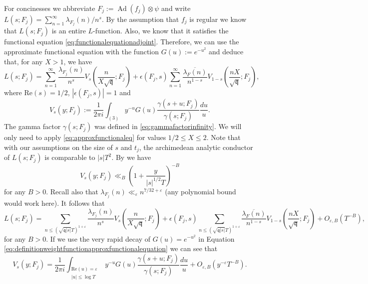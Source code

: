 \documentclass{article}
\theoremstyle{named}
\newcommand{\q}{\mathfrak{q}}
\DeclareMathOperator{\Ad}{Ad}
\begin{document}
For concinesses we abbreviate $F_j := \Ad(f_j)\otimes \psi$ and write $L(s; F_j) = \sum_{n = 1}^\infty \lambda_{F_j}(n)/n^s$.  By the assumption that $f_j$ is regular we know that $L(s; F_j)$ is an entire $L$-function. Also, we know that it satisfies the functional equation \eqref{eq:functionalequationadjoint}. Therefore, we can use the approximate functional equation \cite[Theorem 5.3]{iwanieckowalski} with the function $G(u) := e^{-u^2}$ and deduce that, for any $X > 1$, we have 
\begin{equation}\label{eq:approxfunctionaleq}
    L(s; F_j) = \sum_{n = 1}^\infty \frac{\lambda_{F_j}(n)}{n^s}V_s\left(\frac{n}{X\sqrt{\q}}; F_j\right) + \epsilon(F_j, s)\sum_{n = 1}^\infty \frac{\overline{\lambda_F(n)}}{n^{1-s}}V_{1-s}\left(\frac{nX}{\sqrt{\q}}; F_j\right),
\end{equation}
where $\text{Re}(s) = 1/2$, $|\epsilon(F_j, s)| = 1$ and 
\begin{equation}\label{eq:definitionweightfunctionapproxfunctionalequation}
    V_s(y; F_j):= \frac{1}{2\pi i}\int_{(3)}y^{-u}G(u)\frac{\gamma(s + u; F_j)}{\gamma(s; F_j)}\frac{du}{u}.
\end{equation}
The gamma factor $\gamma(s; F_j)$ was defined in \eqref{eq:gammafactorinfinity}. We will only need to apply \eqref{eq:approxfunctionaleq} for values $1/2 \leq X \leq 2$. Note that with our assumptions on the size of $s$ and $t_j$, the archimedean analytic conductor of $L(s; F_j)$ is comparable to $|s|T^2$. By \cite[Proposition 5.4]{iwanieckowalski} we have 
\begin{equation*}
     V_s(y; F_j) \ll_{B} \left(1 + \frac{y}{|s|^{1/2}T}\right)^{-B}
\end{equation*}
for any $B > 0$. Recall also that $\lambda_{F_j}(n) \ll_\varepsilon n^{7/32 + \varepsilon}$ (any polynomial bound would work here). It follows that 
\begin{equation}\label{eq:truncatedapproximatefunctionalequation}
    L(s; F_j) = \sum_{n \leq (\sqrt{\q|s|}T)^{1 + \varepsilon}} \frac{\lambda_{F_j}(n)}{n^s}V_s\left(\frac{n}{X\sqrt{\q}}; F_j\right) + \epsilon(F_j, s)\sum_{n \leq (\sqrt{\q|s|}T)^{1 + \varepsilon}} \frac{\overline{\lambda_F(n)}}{n^{1-s}}V_{1-s}\left(\frac{nX}{\sqrt{\q}}; F_j\right) + O_{\varepsilon, B}(T^{-B}),
\end{equation}
for any $B > 0$. If we use the very rapid decay of $G(u) = e^{-u^2}$ in Equation \eqref{eq:definitionweightfunctionapproxfunctionalequation} we can see that 
\begin{equation*}
    V_s(y; F_j) = \frac{1}{2\pi i}\int_{\substack{\text{Re}(u) = \varepsilon\\
    |u| \leq \log T}} y^{-u}G(u) \frac{\gamma(s + u; F_j)}{\gamma(s; F_j)}\frac{du}{u} + O_{\varepsilon, B}(y^{-\varepsilon}T^{-B}).
\end{equation*}
\end{document}
